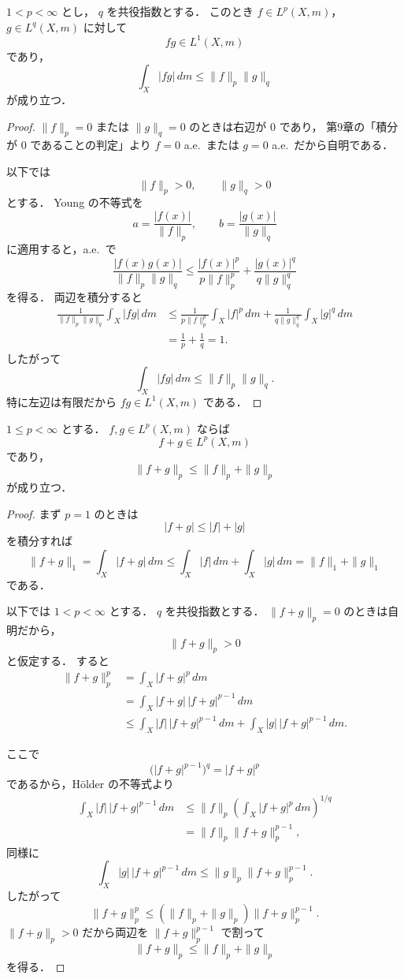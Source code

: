 \begin{theorem}[Hölderの不等式]
$1<p<\infty$ とし，
$q$ を共役指数とする．
このとき
$f\in L^p(X,m)$，
$g\in L^q(X,m)$ に対して
\[
fg\in L^1(X,m)
\]
であり，
\[
\int_X |fg|\,dm\le \|f\|_p\|g\|_q
\]
が成り立つ．
\end{theorem}
\begin{proof}
$\|f\|_p=0$ または $\|g\|_q=0$ のときは右辺が $0$ であり，
第9章の「積分が $0$ であることの判定」より
$f=0$ a.e.\ または $g=0$ a.e.\ だから自明である．

以下では
\[
\|f\|_p>0,\qquad \|g\|_q>0
\]
とする．
Young の不等式を
\[
a=\frac{|f(x)|}{\|f\|_p},
\qquad
b=\frac{|g(x)|}{\|g\|_q}
\]
に適用すると，a.e.\ で
\[
\frac{|f(x)g(x)|}{\|f\|_p\|g\|_q}
\le
\frac{|f(x)|^p}{p\|f\|_p^p}
+\frac{|g(x)|^q}{q\|g\|_q^q}
\]
を得る．
両辺を積分すると
\begin{align*}
\frac{1}{\|f\|_p\|g\|_q}\int_X |fg|\,dm
&\le
\frac{1}{p\|f\|_p^p}\int_X |f|^p\,dm
+
\frac{1}{q\|g\|_q^q}\int_X |g|^q\,dm \\
&=
\frac{1}{p}+\frac{1}{q}
=1.
\end{align*}
したがって
\[
\int_X |fg|\,dm\le \|f\|_p\|g\|_q.
\]
特に左辺は有限だから $fg\in L^1(X,m)$ である．
\end{proof}

\begin{theorem}[Minkowskiの不等式]
$1\le p<\infty$ とする．
$f,g\in L^p(X,m)$ ならば
\[
f+g\in L^p(X,m)
\]
であり，
\[
\|f+g\|_p\le \|f\|_p+\|g\|_p
\]
が成り立つ．
\end{theorem}
\begin{proof}
まず $p=1$ のときは
\[
|f+g|\le |f|+|g|
\]
を積分すれば
\[
\|f+g\|_1
=
\int_X |f+g|\,dm
\le
\int_X |f|\,dm+\int_X |g|\,dm
=
\|f\|_1+\|g\|_1
\]
である．

以下では $1<p<\infty$ とする．
$q$ を共役指数とする．
$\|f+g\|_p=0$ のときは自明だから，
\[
\|f+g\|_p>0
\]
と仮定する．
すると
\begin{align*}
\|f+g\|_p^p
&=
\int_X |f+g|^p\,dm \\
&=
\int_X |f+g|\,|f+g|^{p-1}\,dm \\
&\le
\int_X |f|\,|f+g|^{p-1}\,dm
+
\int_X |g|\,|f+g|^{p-1}\,dm.
\end{align*}

ここで
\[
\bigl(|f+g|^{p-1}\bigr)^q=|f+g|^p
\]
であるから，Hölder の不等式より
\begin{align*}
\int_X |f|\,|f+g|^{p-1}\,dm
&\le
\|f\|_p
\left(
\int_X |f+g|^p\,dm
\right)^{1/q} \\
&=
\|f\|_p \|f+g\|_p^{p-1},
\end{align*}
同様に
\[
\int_X |g|\,|f+g|^{p-1}\,dm
\le
\|g\|_p \|f+g\|_p^{p-1}.
\]
したがって
\[
\|f+g\|_p^p
\le
(\|f\|_p+\|g\|_p)\|f+g\|_p^{p-1}.
\]
$\|f+g\|_p>0$ だから両辺を $\|f+g\|_p^{p-1}$ で割って
\[
\|f+g\|_p\le \|f\|_p+\|g\|_p
\]
を得る．
\end{proof}

